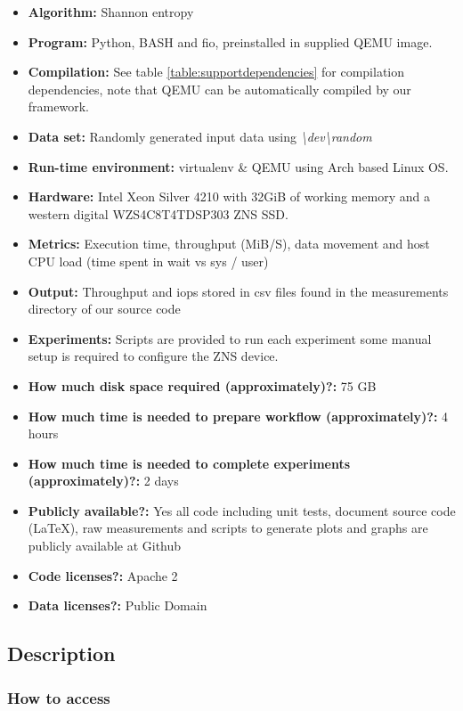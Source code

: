 {\small
\begin{itemize}
  \item {\textbf{Algorithm:} Shannon entropy}
  \item {\textbf{Program:} Python, BASH and fio, preinstalled in supplied
  QEMU image.}
  \item {\textbf{Compilation:} See table \ref{table:supportdependencies} for
  compilation dependencies, note that QEMU can be automatically compiled by our
  framework.}
  \item {\textbf{Data set:} Randomly generated input data using \textit{\textbackslash dev\textbackslash random}}
  \item {\textbf{Run-time environment:} virtualenv \& QEMU using Arch based Linux OS.}
  \item {\textbf{Hardware:} Intel Xeon Silver 4210 with 32GiB of working memory and
  a western digital WZS4C8T4TDSP303 ZNS SSD.}
  \item {\textbf{Metrics:} Execution time, throughput (MiB/S), data movement and
  host CPU load (time spent in wait vs sys / user)}
  \item {\textbf{Output:} Throughput and iops stored in csv files found in the
  measurements directory of our source code \cite{qemu-csd}}
  \item {\textbf{Experiments:} Scripts are provided to run each experiment some
  manual setup is required to configure the ZNS device.}
  \item {\textbf{How much disk space required (approximately)?:} 75 GB}
  \item {\textbf{How much time is needed to prepare workflow (approximately)?:} 4 hours}
  \item {\textbf{How much time is needed to complete experiments (approximately)?:} 2 days}
  \item {\textbf{Publicly available?:} Yes all code including unit tests, document
  source code (LaTeX), raw measurements and scripts to generate plots and graphs
  are publicly available at Github \cite{qemu-csd}}
  \item {\textbf{Code licenses?:} Apache 2}
  \item {\textbf{Data licenses?:} Public Domain}
\end{itemize}
}

\subsection{Description}

\subsubsection{How to access}


